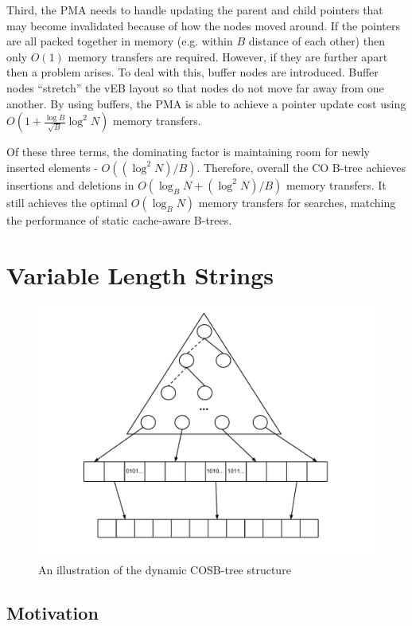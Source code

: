 \documentclass[preprint]{style}
\begin{document}
Third, the PMA needs to handle updating the parent and child pointers that may
become invalidated because of how the nodes moved around. If the pointers are
all packed together in memory (e.g. within $B$ distance of each other) then
only $O(1)$ memory transfers are required. However, if they are further apart
then a problem arises. To deal with this, buffer nodes are introduced.  Buffer
nodes ``stretch'' the vEB layout so that nodes do not move far away from one
another. By using buffers, the PMA is able to achieve a pointer update cost
using $O(1+ \frac{\log{B}}{\sqrt{B}}\log^2{N})$ memory transfers.

Of these three terms, the dominating factor is maintaining room for newly
inserted elements - $O((\log^2{N})/B)$. Therefore, overall the CO B-tree
achieves insertions and deletions in $O(\log_B{N} + (\log^2{N})/B)$ memory
transfers. It still achieves the optimal $O(\log_B{N})$ memory transfers for
searches, matching the performance of static cache-aware B-trees.

\section{Variable Length Strings}
\begin{figure}

\begin{center}
	\includegraphics[width=0.8\columnwidth]{figures/COSB-treegeneralstructurediagram.pdf}
\end{center}

\caption{An illustration of the dynamic COSB-tree structure}
\label{fig:string_structure}
\end{figure}
\subsection{Motivation}
\end{document}
